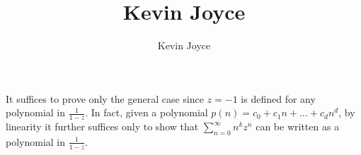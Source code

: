 \documentclass{homework}
\title{Kevin Joyce}
\author{Kevin Joyce}
\begin{document}
 
\newcommand{\figref}[1]{\figurename~\ref{#1}}
\renewcommand{\bar}{\overline}
\renewcommand{\hat}{\widehat}
\renewcommand{\SS}{\mathcal S}
\newcommand{\eps}{\varepsilon}
\newcommand{\TTheta}{\overline{\underline \Theta} }
\newcommand{\del}{\partial}
\newcommand{\approxsim}{\overset{\cdotp}{\underset{\cdotp}{\sim}}}
\newcommand{\FF}{\mathcal F}


\begin{solution}
It suffices to prove only the general case since $z = -1$ is defined for any polynomial in $\frac 1{1-z}$.
%
In fact, given a polynomial $p(n) = c_0 + c_1n + \dots + c_dn^d$, by linearity it further suffices only to show that $\sum_{n=0}^\infty  n^k z^n$ can be written as a polynomial in $\frac 1{1-z}$.


\end{solution}
\end{document}
